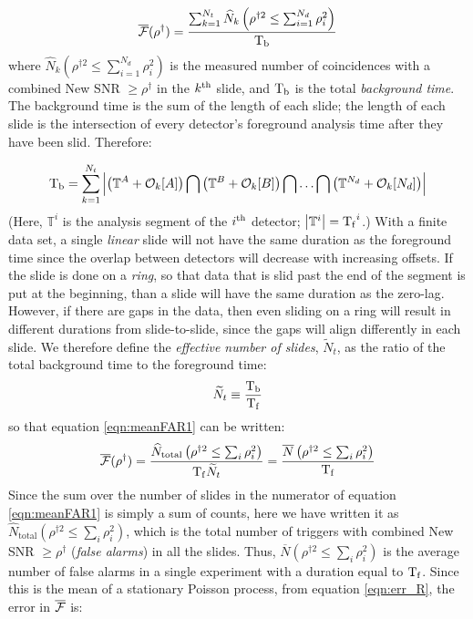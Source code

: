 \begin{equation}
\label{eqn:meanFAR1}
\overline{\far}(\rho^\dagger) = \frac{\sum_{k=1}^{N_t} \widehat{N}_k \left(\rho^{\dagger2} \leq \sum_{i=1}^{N_d} \rho_i^2 \right)}{\Tb} 
\end{equation}
where $\widehat{N}_k \left(\rho^{\dagger2} \leq \sum_{i=1}^{N_d} \rho_i^2 \right)$ is the measured number of coincidences with a combined New \ac{SNR} $\geq \rho^\dagger$ in the $k^{\mathrm{th}}$ slide, and $\mathrm{T_b}$ is the total \emph{background time}. The background time is the sum of the length of each slide; the length of each slide is the intersection of every detector's foreground analysis time after they have been slid. Therefore:

\begin{equation}
\label{eqn:tBackground}
\Tb = \sum_{k=1}^{N_t} \left| \left( \mathbb{T}^A + \mathcal{O}_k[A] \right) \bigcap \left( \mathbb{T}^B + \mathcal{O}_k[B] \right) \bigcap \ldots \bigcap \left( \mathbb{T}^{N_d} + \mathcal{O}_k[N_d] \right) \right|
\end{equation}
(Here, $\mathbb{T}^i$ is the analysis segment of the $i^{\mathrm{th}}$ detector; $\left| \mathbb{T}^i \right| = \mathrm{T_f}^i$.) With a finite data set, a single \emph{linear} slide will not have the same duration as the foreground time since the overlap between detectors will decrease with increasing offsets. If the slide is done on a \emph{ring}, so that data that is slid past the end of the segment is put at the beginning, than a slide will have the same duration as the zero-lag. However, if there are gaps in the data, then even sliding on a ring will result in different durations from slide-to-slide, since the gaps will align differently in each slide. We therefore define the \emph{effective number of slides}, $\widetilde{N}_t$, as the ratio of the total background time to the foreground time:
\begin{equation}
\label{eqn:effective_Nslides}
\widetilde{N}_t \equiv \frac{\Tb}{\Tf}
\end{equation}
so that equation \ref{eqn:meanFAR1} can be written:
\begin{equation}
\label{eqn:meanFAR2}
\overline{\far}(\rho^\dagger) = \frac{\widehat{N}_{\mathrm{total}} \left(\rho^{\dagger2} \leq \sum_{i} \rho_i^2 \right)}{\Tf \widetilde{N}_t} = \frac{\overline{N} \left(\rho^{\dagger2} \leq \sum_{i} \rho_i^2 \right)}{\Tf}
\end{equation}
Since the sum over the number of slides in the numerator of equation \ref{eqn:meanFAR1} is simply a sum of counts, here we have written it as $\widehat{N}_{\mathrm{total}} \left(\rho^{\dagger2} \leq \sum_{i} \rho_i^2 \right)$, which is the total number of triggers with combined New \ac{SNR} $\geq \rho^\dagger$ (\emph{false alarms}) in all the slides. Thus, $\overline{N} \left(\rho^{\dagger2} \leq \sum_{i} \rho_i^2 \right)$ is the average number of false alarms in a single experiment with a duration equal to $\mathrm{T_f}$. Since this is the mean of a stationary Poisson process, from equation \ref{eqn:err_R}, the error in $\overline{\mathcal{F}}$ is:
